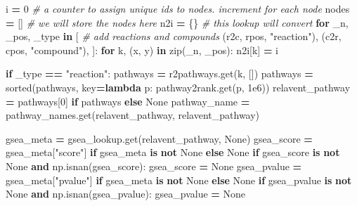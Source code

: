 \documentclass[
]{book}
\newenvironment{Shaded}{\begin{snugshade}}{\end{snugshade}}
\newcommand{\BuiltInTok}[1]{#1}
\newcommand{\CommentTok}[1]{\textcolor[rgb]{0.56,0.35,0.01}{\textit{#1}}}
\newcommand{\ControlFlowTok}[1]{\textcolor[rgb]{0.13,0.29,0.53}{\textbf{#1}}}
\newcommand{\DecValTok}[1]{\textcolor[rgb]{0.00,0.00,0.81}{#1}}
\newcommand{\FloatTok}[1]{\textcolor[rgb]{0.00,0.00,0.81}{#1}}
\newcommand{\KeywordTok}[1]{\textcolor[rgb]{0.13,0.29,0.53}{\textbf{#1}}}
\newcommand{\NormalTok}[1]{#1}
\newcommand{\OperatorTok}[1]{\textcolor[rgb]{0.81,0.36,0.00}{\textbf{#1}}}
\newcommand{\StringTok}[1]{\textcolor[rgb]{0.31,0.60,0.02}{#1}}
\newcommand{\VariableTok}[1]{\textcolor[rgb]{0.00,0.00,0.00}{#1}}
\begin{document}
\begin{Shaded}
\begin{Highlighting}[numbers=left,,]
\NormalTok{i }\OperatorTok{=} \DecValTok{0}       \CommentTok{\# a counter to assign unique ids to nodes. increment for each node}
\NormalTok{nodes }\OperatorTok{=}\NormalTok{ []  }\CommentTok{\# we will store the nodes here}
\NormalTok{n2i }\OperatorTok{=}\NormalTok{ \{\}    }\CommentTok{\# this lookup will convert }
\ControlFlowTok{for}\NormalTok{ \_n, \_pos, \_type }\KeywordTok{in}\NormalTok{ [    }\CommentTok{\# add reactions and compounds}
\NormalTok{    (r2c, rpos, }\StringTok{"reaction"}\NormalTok{),}
\NormalTok{    (c2r, cpos, }\StringTok{"compound"}\NormalTok{),}
\NormalTok{]:}
    \ControlFlowTok{for}\NormalTok{ k, (x, y) }\KeywordTok{in} \BuiltInTok{zip}\NormalTok{(\_n, \_pos):}
\NormalTok{        n2i[k] }\OperatorTok{=}\NormalTok{ i}

        \ControlFlowTok{if}\NormalTok{ \_type }\OperatorTok{==} \StringTok{"reaction"}\NormalTok{:}
\NormalTok{            pathways }\OperatorTok{=}\NormalTok{ r2pathways.get(k, [])}
\NormalTok{            pathways }\OperatorTok{=} \BuiltInTok{sorted}\NormalTok{(pathways, key}\OperatorTok{=}\KeywordTok{lambda}\NormalTok{ p: pathway2rank.get(p, }\FloatTok{1e6}\NormalTok{))}
\NormalTok{            relavent\_pathway }\OperatorTok{=}\NormalTok{ pathways[}\DecValTok{0}\NormalTok{] }\ControlFlowTok{if}\NormalTok{ pathways }\ControlFlowTok{else} \VariableTok{None}
\NormalTok{            pathway\_name }\OperatorTok{=}\NormalTok{ pathway\_names.get(relavent\_pathway, relavent\_pathway)}
            
\NormalTok{            gsea\_meta }\OperatorTok{=}\NormalTok{ gsea\_lookup.get(relavent\_pathway, }\VariableTok{None}\NormalTok{)}
\NormalTok{            gsea\_score }\OperatorTok{=}\NormalTok{ gsea\_meta[}\StringTok{"score"}\NormalTok{] }\ControlFlowTok{if}\NormalTok{ gsea\_meta }\KeywordTok{is} \KeywordTok{not} \VariableTok{None} \ControlFlowTok{else} \VariableTok{None}
            \ControlFlowTok{if}\NormalTok{ gsea\_score }\KeywordTok{is} \KeywordTok{not} \VariableTok{None} \KeywordTok{and}\NormalTok{ np.isnan(gsea\_score):}
\NormalTok{                gsea\_score }\OperatorTok{=} \VariableTok{None}
\NormalTok{            gsea\_pvalue }\OperatorTok{=}\NormalTok{ gsea\_meta[}\StringTok{"pvalue"}\NormalTok{] }\ControlFlowTok{if}\NormalTok{ gsea\_meta }\KeywordTok{is} \KeywordTok{not} \VariableTok{None} \ControlFlowTok{else} \VariableTok{None}
            \ControlFlowTok{if}\NormalTok{ gsea\_pvalue }\KeywordTok{is} \KeywordTok{not} \VariableTok{None} \KeywordTok{and}\NormalTok{ np.isnan(gsea\_pvalue):}
\NormalTok{                gsea\_pvalue }\OperatorTok{=} \VariableTok{None}


\end{Highlighting}
\end{Shaded}
\end{document}
